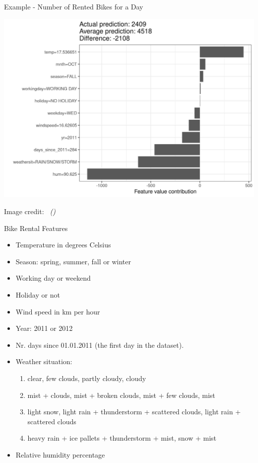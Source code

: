 \documentclass[dvipsnames]{beamer}
\newcommand{\credit}[2]{\par\hfill \footnotesize #1 credit:~\itshape\citeauthor{#2} (\citeyear{#2})}
\begin{document}
\begin{frame}{Example - Number of Rented Bikes for a Day}
	\begin{center}
		\includegraphics[scale=0.6]{images/shapley-bike-plot-1.jpeg}
	\end{center}
	\credit{Image}{molnar2020interpretable}
\end{frame}

\begin{frame}{Bike Rental Features\footnotemark}
	\begin{itemize}
		\item Temperature in degrees Celsius
		\item Season: spring, summer, fall or winter
		\item Working day or weekend
		\item Holiday or not
		\item Wind speed in km per hour
		\item Year: 2011 or 2012
		\item Nr. days since 01.01.2011 (the first day in the dataset).
		\item Weather situation:
		\begin{enumerate}[a]
			\item clear, few clouds, partly cloudy, cloudy
			\item mist + clouds, mist + broken clouds, mist + few clouds, mist
			\item light snow, light rain + thunderstorm + scattered clouds, light rain + scattered clouds
			\item heavy rain + ice pallets + thunderstorm + mist, snow + mist
		\end{enumerate}
		\item Relative humidity percentage
	\end{itemize}
\end{frame}
\end{document}
